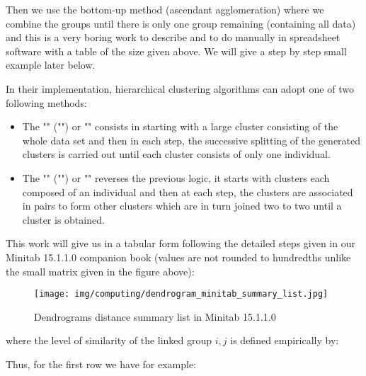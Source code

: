	Then we use the bottom-up method (ascendant agglomeration) where we combine the groups until there is only one group remaining (containing all data) and this is a very boring work to describe and to do manually in spreadsheet software with a table of the size given above. We will give a step by step small example later below.
	\begin{tcolorbox}[title=Remark,colframe=black,arc=10pt]
	In their implementation, hierarchical clustering algorithms can adopt one of two following methods:
	\begin{itemize}
		\item The "" ("") or "" consists in starting with a large cluster consisting of the whole data set and then in each step, the successive splitting of the generated clusters is carried out until each cluster consists of only one individual.
	
		\item The "" ("") or "" reverses the previous logic, it starts with clusters each composed of an individual and then at each step, the clusters are associated in pairs to form other clusters which are in turn joined two to two until a cluster is obtained.
	\end{itemize}
	\end{tcolorbox}
	This work will give us in a tabular form following the detailed steps given in our Minitab 15.1.1.0 companion book (values are not rounded to hundredths unlike the small matrix given in the figure above):
	\begin{figure}[H]
		\centering
		\texttt{[image: img/computing/dendrogram\_minitab\_summary\_list.jpg]}
		\caption[]{Dendrograms distance summary list in Minitab 15.1.1.0}
	\end{figure}
	where the level of similarity of the linked group $i,j$ is defined empirically by:
	
	Thus, for the first row we have for example:
	
